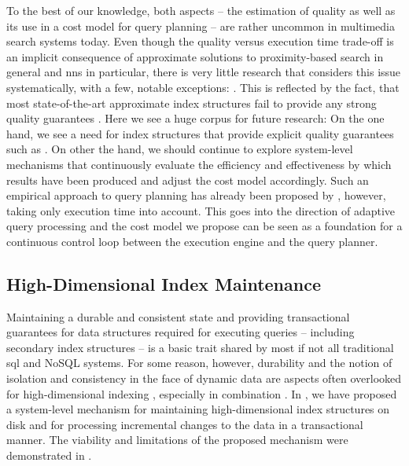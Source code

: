 To the best of our knowledge, both aspects -- the estimation of quality as well as its use in a cost model for query planning -- are rather uncommon in multimedia search systems today. Even though the quality versus execution time trade-off is an implicit consequence of approximate solutions to proximity-based search in general and \acrshort{nns} in particular, there is very little research that considers this issue systematically, with a few, notable exceptions: \cite{Weber:2000Trading,Blok2001:Predicting,Siguroardottir:2005Quality}. This is reflected by the fact, that most state-of-the-art approximate index structures fail to provide any strong quality guarantees \cite{Echihabi:2021High}. Here we see a huge corpus for future research: On the one hand, we see a need for index structures that provide explicit quality guarantees such as \cite{Lu:2020VHP}. On other the hand, we should continue to explore system-level mechanisms that continuously evaluate the efficiency and effectiveness by which results have been produced and adjust the cost model accordingly. Such an empirical approach to query planning has already been proposed by \cite{Giangreco:2018Database}, however, taking only execution time into account. This goes into the direction of adaptive query processing \cite{Deshpande:2007Adaptive} and the cost model we propose can be seen as a foundation for a continuous control loop between the execution engine and the query planner.

\subsection{High-Dimensional Index Maintenance}

Maintaining a durable and consistent state and providing transactional guarantees for data structures required for executing queries -- including secondary index structures -- is a basic trait shared by most if not all traditional \acrshort{sql} and NoSQL systems. For some reason, however, durability and the notion of isolation and consistency in the face of dynamic data are aspects often overlooked for high-dimensional indexing \cite{Amsaleg:2014Database,Hojsgaard:2019Index}, especially in combination \cite{Amsaleg:2014Database}. In , we have proposed a system-level mechanism for maintaining high-dimensional index structures on disk and for processing incremental changes to the data in a transactional manner. The viability and limitations of the proposed mechanism were demonstrated in .

